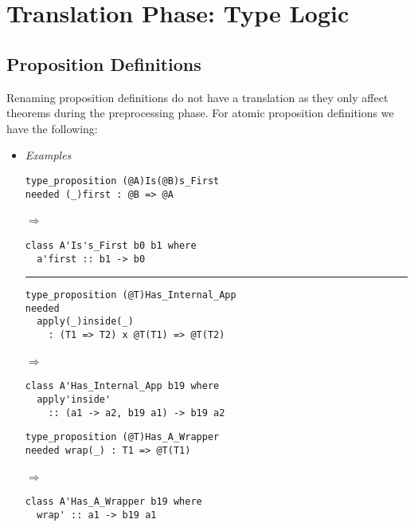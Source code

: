\documentclass[diploma]{softlab-thesis}
\def\lra{$\Longrightarrow$\ }
\begin{document}
\newpage
\section{Translation Phase: Type Logic}

\subsection{Proposition Definitions}

Renaming proposition definitions do not have a translation as they only
affect theorems during the preprocessing phase. For atomic proposition
definitions we have the following:

\begin{itemize}

\item
\textit{Examples}\\

\begin{minipage}{0.45\linewidth}
\begin{verbatim}
type_proposition (@A)Is(@B)s_First
needed (_)first : @B => @A
\end{verbatim}

\lra

\begin{verbatim}
class A'Is's_First b0 b1 where
  a'first :: b1 -> b0
\end{verbatim}

\rule{\linewidth}{0.1pt}

\begin{verbatim}
type_proposition (@T)Has_Internal_App
needed
  apply(_)inside(_)
    : (T1 => T2) x @T(T1) => @T(T2)
\end{verbatim}

\lra

\begin{verbatim}
class A'Has_Internal_App b19 where
  apply'inside'
    :: (a1 -> a2, b19 a1) -> b19 a2
\end{verbatim}
\end{minipage}
\hfill\vline\hfill
\begin{minipage}{0.40\linewidth}
\begin{verbatim}
type_proposition (@T)Has_A_Wrapper
needed wrap(_) : T1 => @T(T1)
\end{verbatim}

\lra

\begin{verbatim}
class A'Has_A_Wrapper b19 where
  wrap' :: a1 -> b19 a1
\end{verbatim}


\end{minipage}
\end{itemize}
\end{document}
